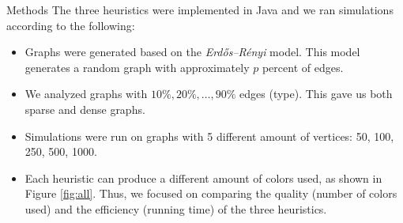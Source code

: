 \documentclass[final]{beamer}
\newlength{\twocolwid}
\newlength{\halfcolwid}
\begin{document}
\begin{frame}[t]
\begin{columns}[t]
\begin{column}{\twocolwid}
\begin{columns}
      \begin{column}{\halfcolwid}
        \vspace{-0.7cm}
        \begin{block}{Methods}
          The three heuristics were implemented in Java and we ran simulations according to the following:
          \begin{itemize}
            \setlength\itemsep{0.4em}
            \item Graphs were generated based on the \emph{Erdős–Rényi} model. This model generates a random graph with approximately $p$ percent of edges.
            \item We analyzed graphs with $10\%, 20\%, \ldots, 90\%$ edges (type). This gave us both sparse and dense graphs.
            \item Simulations were run on graphs with 5 different amount of vertices: 50, 100, 250, 500, 1000.
            \item Each heuristic can produce a different amount of colors used, as shown in Figure \ref{fig:all}. Thus, we focused on comparing the quality (number of colors used) and the efficiency (running time) of the three heuristics.
          \end{itemize}
        \end{block}
      \end{column}
    \end{columns}


\end{column}
\end{columns}
\end{frame}
\end{document}
